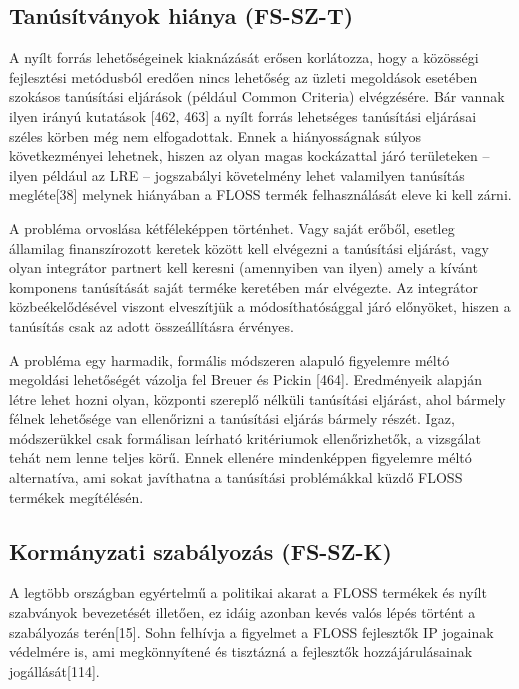 \documentclass[12pt,magyar,a4paper,oneside]{scrreprt}
\begin{document}
\hypertarget{sec:FS-SZ-T}{%
\subsection{Tanúsítványok hiánya (FS-SZ-T)}\label{sec:FS-SZ-T}}

A nyílt forrás lehetőségeinek kiaknázását erősen korlátozza, hogy a
közösségi fejlesztési metódusból eredően nincs lehetőség az üzleti
megoldások esetében szokásos tanúsítási eljárások (például Common
Criteria) elvégzésére. Bár vannak ilyen irányú kutatások {[}462, 463{]}
a nyílt forrás lehetséges tanúsítási eljárásai széles körben még nem
elfogadottak. Ennek a hiányosságnak súlyos következményei lehetnek,
hiszen az olyan magas kockázattal járó területeken -- ilyen például az
LRE -- jogszabályi követelmény lehet valamilyen tanúsítás
megléte{[}38{]} melynek hiányában a FLOSS termék felhasználását eleve ki
kell zárni.

A probléma orvoslása kétféleképpen történhet. Vagy saját erőből, esetleg
államilag finanszírozott keretek között kell elvégezni a tanúsítási
eljárást, vagy olyan integrátor partnert kell keresni (amennyiben van
ilyen) amely a kívánt komponens tanúsítását saját terméke keretében már
elvégezte. Az integrátor közbeékelődésével viszont elveszítjük a
módosíthatósággal járó előnyöket, hiszen a tanúsítás csak az adott
összeállításra érvényes.

A probléma egy harmadik, formális módszeren alapuló figyelemre méltó
megoldási lehetőségét vázolja fel Breuer és Pickin {[}464{]}.
Eredményeik alapján létre lehet hozni olyan, központi szereplő nélküli
tanúsítási eljárást, ahol bármely félnek lehetősége van ellenőrizni a
tanúsítási eljárás bármely részét. Igaz, módszerükkel csak formálisan
leírható kritériumok ellenőrizhetők, a vizsgálat tehát nem lenne teljes
körű. Ennek ellenére mindenképpen figyelemre méltó alternatíva, ami
sokat javíthatna a tanúsítási problémákkal küzdő FLOSS termékek
megítélésén.

\hypertarget{sec:FS-SZ-K}{%
\subsection{Kormányzati szabályozás (FS-SZ-K)}\label{sec:FS-SZ-K}}

A legtöbb országban egyértelmű a politikai akarat a FLOSS termékek és
nyílt szabványok bevezetését illetően, ez idáig azonban kevés valós
lépés történt a szabályozás terén{[}15{]}. Sohn felhívja a figyelmet a
FLOSS fejlesztők IP jogainak védelmére is, ami megkönnyítené és
tisztázná a fejlesztők hozzájárulásainak jogállását{[}114{]}.
\end{document}
